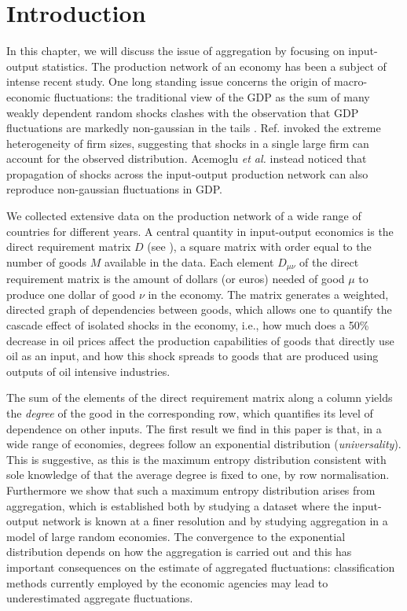 

\section{Introduction}

In this chapter, we will discuss the issue of aggregation by focusing on
input-output statistics. The production network of an economy has been
a subject of intense recent study. One long standing issue concerns
the origin of macro-economic fluctuations: the traditional view of the
GDP as the sum of many weakly dependent random shocks clashes with the
observation that GDP fluctuations are markedly non-gaussian in the
tails \cite{non-gaussGDP}. Ref. \cite{Gabaix} invoked the extreme
heterogeneity of firm sizes, suggesting that shocks in a single large
firm can account for the observed distribution.  Acemoglu {\em et al.}
\cite{Acemoglu12} instead noticed that propagation of shocks across
the input-output production network can also reproduce non-gaussian
fluctuations in GDP.

We collected extensive data on the production network of a wide range
of countries for different years.  A central quantity in input-output
economics is the direct requirement matrix $D$ (see \cite{Acemoglu12,BEA_handbook}), a square matrix with order equal to the number of
goods $M$ available in the data. Each element $D_{\mu\nu}$ of the
direct requirement matrix is the amount of dollars (or euros) needed
of good $\mu$ to produce one dollar of good $\nu$ in the economy. The
matrix generates a weighted, directed graph of dependencies between
goods, which allows one to quantify the cascade effect of isolated
shocks in the economy, i.e., how much does a 50\% decrease in oil
prices affect the production capabilities of goods that directly use
oil as an input, and how this shock spreads to goods that are produced
using outputs of oil intensive industries.

The sum of the elements of the direct requirement matrix along a
column yields the {\em degree} of the good in the corresponding row,
which quantifies its level of dependence on other inputs.  The first
result we find in this paper is that, in a wide range of economies,
degrees follow an exponential distribution ({\em universality}). This
is suggestive, as this is the maximum entropy distribution consistent
with sole knowledge of that the average degree is fixed to one, by row
normalisation.  Furthermore we show that such a maximum entropy
distribution arises from aggregation, which is established both by
studying a dataset where the input-output network is known at a finer
resolution and by studying aggregation in a model of large random
economies.  The convergence to the exponential distribution depends on
how the aggregation is carried out and this has important consequences
on the estimate of aggregated fluctuations: classification methods
currently employed by the economic agencies may lead to underestimated
aggregate fluctuations.

